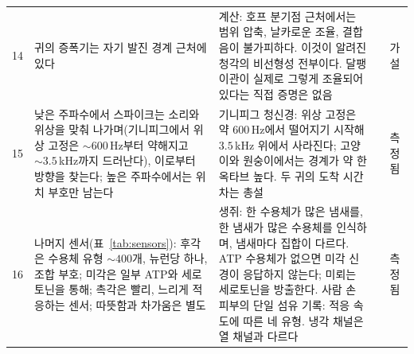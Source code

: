 {\begin{longtable}{>{\raggedright}p{0.5cm}>{\raggedright}p{4.0cm}>{\raggedright}p{5.6cm}>{\raggedright}p{2.3cm}>{\raggedright\arraybackslash}p{1.7cm}}
14 & 귀의 증폭기는 자기 발진 경계 근처에 있다 & 계산: 호프 분기점 근처에서는 범위 압축, 날카로운 조율, 결합음이 불가피하다. 이것이 알려진 청각의 비선형성 전부이다. 달팽이관이 실제로 그렇게 조율되어 있다는 직접 증명은 없음 & \cite{Eguiluz2000} & 가설 \\
15 & 낮은 주파수에서 스파이크는 소리와 위상을 맞춰 나가며(기니피그에서 위상 고정은 $\sim600$\,Hz부터 약해지고 $\sim3.5$\,kHz까지 드러난다), 이로부터 방향을 찾는다; 높은 주파수에서는 위치 부호만 남는다 & 기니피그 청신경: 위상 고정은 약 $600$\,Hz에서 떨어지기 시작해 $3.5$\,kHz 위에서 사라진다; 고양이와 원숭이에서는 경계가 약 한 옥타브 높다. 두 귀의 도착 시간 차는 총설 & \cite{PalmerRussell1986,Grothe2010} & 측정됨 \\
16 & 나머지 센서(표~\ref{tab:sensors}): 후각은 수용체 유형 $\sim400$개, 뉴런당 하나, 조합 부호; 미각은 일부 ATP와 세로토닌을 통해; 촉각은 빨리, 느리게 적응하는 센서; 따뜻함과 차가움은 별도 & 생쥐: 한 수용체가 많은 냄새를, 한 냄새가 많은 수용체를 인식하며, 냄새마다 집합이 다르다. ATP 수용체가 없으면 미각 신경이 응답하지 않는다; 미뢰는 세로토닌을 방출한다. 사람 손 피부의 단일 섬유 기록: 적응 속도에 따른 네 유형. 냉각 채널은 열 채널과 다르다 & \cite{Mombaerts2004,Malnic1999,Finger2005,Huang2005,JohanssonVallbo1979,McKemy2002} & 측정됨 \\
\bottomrule
\end{longtable}}
